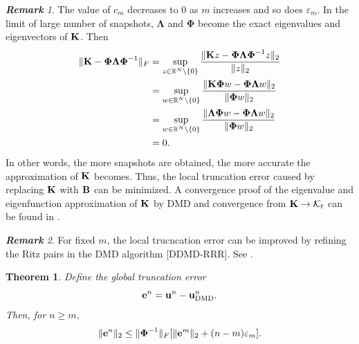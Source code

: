 \documentclass[10pt]{article}
\numberwithin{equation}{section}
\theoremstyle{plain}
\newtheorem{theorem}{Theorem}[section]
\theoremstyle{remark}
\newtheorem{remark}{\bf Remark}[section]
\theoremstyle{remark}
\begin{document}
\begin{remark}
The value of $c_m$ decreases to $0$ as $m$ increases and so does $\varepsilon_m$. In the limit of large number of snapshots, $\boldsymbol\Lambda$ and $\boldsymbol\Phi$ become the exact eigenvalues and eigenvectors of $\bold K$. Then 
\begin{equation}\label{eq:3-12}
\begin{aligned}
\|\bold K-\boldsymbol\Phi\boldsymbol\Lambda\boldsymbol\Phi^{-1}\|_F &= \sup_{z\in \mathbb R^{N}\setminus\{ 0\}}\frac{\|\bold Kz-\boldsymbol\Phi\boldsymbol\Lambda \boldsymbol\Phi^{-1}z\|_2}{\|z\|_2}\\
&= \sup_{w\in \mathbb R^{N}\setminus\{ 0\}}\frac{\|\bold K \boldsymbol\Phi w-\boldsymbol\Phi\boldsymbol\Lambda w\|_2}{\|\boldsymbol\Phi w\|_2}\\
&= \sup_{w\in \mathbb R^{N}\setminus\{ 0\}}\frac{\|\boldsymbol\Lambda \boldsymbol\Phi w-\boldsymbol\Phi\boldsymbol\Lambda w\|_2}{\|\boldsymbol\Phi w\|_2}\\
&=0.
\end{aligned}
\end{equation}
In other words, the more snapshots are obtained, the more accurate the approximation of $\bold K$ becomes. Thus, the local truncation error caused by replacing $\bold K$ with $\bold B$ can be minimized. A convergence proof of the eigenvalue and eigenfunction approximation of $\bold K$ by DMD and convergence from $\bold K \to \mathcal K_t$ can be found in \cite{korda2018convergence}.
\end{remark}

\begin{remark}
For fixed $m$,  the local trucncation error can be improved by refining the Ritz pairs in the DMD algorithm [DDMD-RRR]. See \cite{drmac2018data}.
\end{remark}

\begin{theorem}\label{thm:t3-7}
Define the global truncation error
\begin{equation}\label{eq:3-13}
\bold e^n = \bold u^n-\bold u_\mathrm{DMD}^n.
\end{equation}
Then, for $n\geq m$,
\begin{equation}\label{eq:3-14}
\|\bold e^n\|_2 \leq \|\boldsymbol\Phi^{-1}\|_F[\|\bold e^m\|_2+(n-m)\varepsilon_m].
\end{equation}
\end{theorem}
\end{document}

